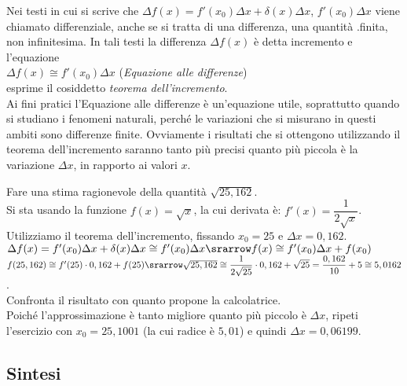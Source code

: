 Nei testi in cui si scrive che $\Delta f(x)=f'(x_0)\Delta x+\delta(x)\Delta x$,
$f'(x_0)\Delta x$ viene chiamato differenziale, anche se si tratta di una differenza,
una quantità .finita, non infinitesima. In tali testi la differenza $\Delta f(x)$ è detta 
incremento e l'equazione\\
$\Delta f(x)\cong f'(x_0)\Delta x$ \hspace{.5cm}(\emph{Equazione alle differenze})\\ 
esprime il cosiddetto \emph{teorema dell'incremento}.\\
Ai fini pratici l'Equazione alle differenze è un'equazione utile, soprattutto 
quando si studiano i fenomeni naturali, perché le variazioni che si misurano in
questi ambiti sono differenze finite. 
Ovviamente i risultati che si ottengono utilizzando il teorema dell'incremento
saranno tanto più precisi quanto più piccola è la variazione $\Delta x$, in 
rapporto ai valori $x$.

\begin {esempio}
Fare una stima ragionevole della quantità $\sqrt{25,162}$.\\
Si sta usando la funzione $f(x)=\sqrt{x}$, la cui derivata è: 
$f'(x)=\dfrac{1}{2\sqrt{x}}$.\\
Utilizziamo il teorema dell'incremento, fissando $x_0=25$ e $\Delta x=0,162$.\\
$\Delta f(x)=f'(x_0)\Delta x+\delta(x)\Delta x\cong f'(x_0)\Delta x
\srarrow f(x)\cong f'(x_0)\Delta x+ f(x_0)$\\
$f(25,162)\cong f'(25)\cdot 0,162+f(25)\srarrow 
\sqrt{25,162}\cong \dfrac{1}{2\sqrt{25}}\cdot 0,162+ \sqrt{25}=
\dfrac{0,162}{10}+5\cong 5,0162$.\\
Confronta il risultato con quanto propone la calcolatrice.\\
Poiché l'approssimazione è tanto migliore quanto più piccolo è $\Delta x$,
ripeti l'esercizio con $x_0=25,1001$ (la cui radice è $5,01$) e quindi
$\Delta x=0,06199$.
\end {esempio}

\subsection{Sintesi}
\label{subsec:diff01_derisintesi}

